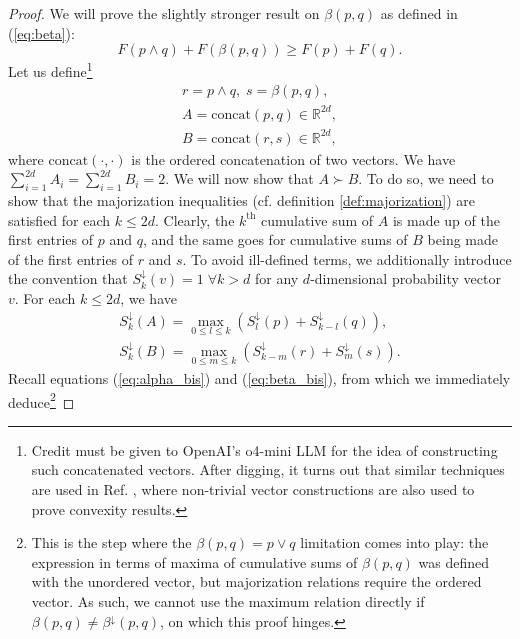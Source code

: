 \begin{proof} \label{proof:alternative_supermodularity}
    We will prove the slightly stronger result on $\beta(p, q)$ as defined in (\ref{eq:beta}):
    \begin{equation} \label{eq:beta_supermodularity}
        F(p \wedge q) + F(\beta(p, q)) \geq F(p) + F(q).
    \end{equation}
    Let us define\footnote{Credit must be given to OpenAI's o4-mini LLM for the idea of constructing such concatenated vectors. After digging, it turns out that similar techniques are used in Ref. \cite[pp. 133--136]{marshall_inequalities_2011}, where non-trivial vector constructions are also used to prove convexity results.}
    \begin{gather}
        r = p \wedge q, \; s = \beta(p, q), \\
        A = \text{concat}(p, q) \in \mathbb{R}^{2d}, \\
        B = \text{concat}(r, s) \in \mathbb{R}^{2d},
    \end{gather}
    where $\text{concat}(\cdot, \cdot)$ is the ordered concatenation of two vectors. We have $\sum_{i=1}^{2d} A_i = \sum_{i=1}^{2d} B_i = 2$. We will now show that $A \succ B$. To do so, we need to show that the majorization inequalities (cf. definition \ref{def:majorization}) are satisfied for each $k \leq 2d$. Clearly, the $k^{\text{th}}$ cumulative sum of $A$ is made up of the first entries of $p$ and $q$, and the same goes for cumulative sums of $B$ being made of the first entries of $r$ and $s$. To avoid ill-defined terms, we additionally introduce the convention that $S^\downarrow_k (v) = 1 \; \forall k > d$ for any $d$-dimensional probability vector $v$. For each $k \leq 2d$, we have
    \begin{gather}
        S^\downarrow_k (A) = \max_{0\leq l\leq k} \left(S^\downarrow_l (p) + S^\downarrow_{k-l} (q)\right), \\
        S^\downarrow_k (B) = \max_{0\leq m\leq k} \left(S^\downarrow_{k-m} (r)+ S^\downarrow_m (s)\right). \label{eq:max_supermod}
    \end{gather} %
    Recall equations (\ref{eq:alpha_bis}) and (\ref{eq:beta_bis}), from which we immediately deduce\footnote{This is the step where the $\beta(p, q) = p \vee q$ limitation comes into play: the expression in terms of maxima of cumulative sums of $\beta(p, q)$ was defined with the unordered vector, but majorization relations require the ordered vector. As such, we cannot use the maximum relation directly if $\beta(p, q) \neq \beta^\downarrow(p, q)$, on which this proof hinges.}

\end{proof}
